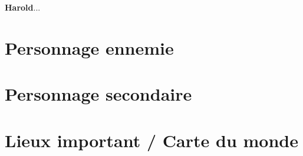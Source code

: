 \textbf{Harold}...
\newpage

\section{Personnage ennemie} %
\newpage


\section{Personnage secondaire} %
\newpage


\section{Lieux important / Carte du monde} %
\newpage